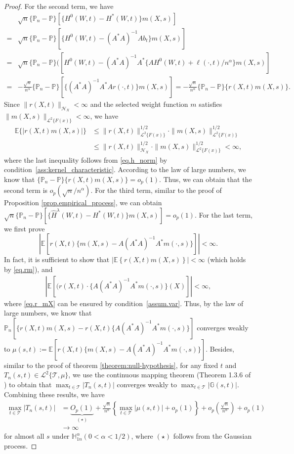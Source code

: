\documentclass[
  12pt]{article}
\def\to{\rightarrow}
\def\mE{\mathbb{E}}
\def\mG{\mathbb{G}}
\def\mH{\mathbb{H}}
\def\mP{\mathbb{P}}
\def\cH{\mathcal{H}}
\def\cL{\mathcal{L}}
\def\cT{\mathcal{T}}
\def\mE{\mathbb{E}}
\begin{document}
\begin{proof}
For the second term, we have
\begin{align*}
   & \sqrt{n}\{\mathbb{P}_n-\mP\}[\{H^0(W,t)-H^*(W,t)\}m(X,s)]\\
   =&\sqrt{n}\{\mathbb{P}_n-\mP\}[\{H^0(W,t)-(A^*A)^{-1}Ab_t\}m(X,s)]\\
    =&\sqrt{n}\{\mathbb{P}_n-\mP\}([H^0(W,t)-(A^*A)^{-1}A^*\{AH^0(W,t)+\ell(\cdot,t)/n^{\alpha}\}m(X,s)]\\
    =&-\frac{\sqrt{n}}{n^{\alpha}}\{\mathbb{P}_n-\mP\}[\{(A^*A)^{-1}A^*Ar(\cdot,t)\}m(X,s)]=-\frac{\sqrt{n}}{n^{\alpha}}\{\mathbb{P}_n-\mP\}\{r(X,t)m(X,s)\}.
\end{align*}
Since $\|r(X,t)\|_{\cH_X}<
\infty$ and the selected weight function $m$ satisfies $\| m(X,s)\|_{\mathcal{L}^2\{F(x)\}}<\infty$, we have
\begin{align}
\mE\{|r(X,t)m(X,s)|\}&\le \| r(X,t)\|_{\mathcal{L}^2\{F(x)\}}^{1/2}\cdot \| m(X,s)\|_{\mathcal{L}^2\{F(x)\}}^{1/2} \nonumber \\
	&\le \| r(X,t)\|_{\mathcal{H}_X}^{1/2}\cdot \| m(X,s)\|_{\mathcal{L}^2\{F(x)\}}^{1/2}<\infty, \label{eq.rm}
\end{align}
where the last inequality follows from \eqref{eq.h_norm} by condition~\ref{ass:kernel_characteristic}. According to the law of large numbers, we know that $\{\mathbb{P}_n-\mP\}\{r(X,t)m(X,s)\}=o_p(1)$. Thus, we can obtain that the second term is $o_p(\sqrt{n}/n^\alpha)$. For the third term, similar to the proof of Proposition \ref{prop.empirical_process}, we can obtain $\sqrt{n}\{\mathbb{P}_n-\mP\}[\{\widehat{H}^\lambda(W,t)-H^*(W,t)\}m(X,s)]=o_p(1)$. For the last term, we first prove 
$$\left|\mathbb{E}[r(X,t)\{m(X,s)-A(A^*A)^{-1}A^*m(\cdot,s)\}] \right|<\infty.
$$
In fact, it is sufficient to show that $|\mathbb{E} \left\{r(X,t) m(X,s)\right\}|<\infty$ (which holds by \eqref{eq.rm}), and 
\begin{align}
    \left|\mathbb{E} [(r(X,t)\cdot \{A(A^*A)^{-1}A^*m(\cdot,s)\}(X)]\right|<\infty, \label{eq.r_mX}
\end{align}
where \eqref{eq.r_mX} can be ensured by condition~\ref{assum.var}. Thus, by the law of large numbers, we know that $\mP_n[\{r(X,t)m(X,s)-r(X,t)\{A(A^*A)^{-1}A^*m(\cdot,s)\}]$ converges weakly to $\mu(s,t):=\mathbb{E}[r(X,t)\{m(X,s)-A(A^*A)^{-1}A^*m(\cdot,s)\}]$. Besides, similar to the proof of theorem \ref{theorem:null-hypothesis}, for any fixed $t$ and $T_n(s,t)\in \cL^2\{\cT, \mu \}$, we use the continuous mapping theorem (Theorem 1.3.6 of \cite{wellner2013weak}) to obtain that $\max_{t\in \cT} |T_n(s,t)|$ converges weakly to $\max_{t\in \cT} |\mG(s,t)|$. Combining these results, we have
\begin{align*}
     \max_{t\in \cT} |T_n(s,t)|&=\underset{( \star )}{\underbrace{O_p(1)}}+ \frac{\sqrt{n}}{n^{\alpha}}\left\{\max_{t\in \cT} |\mu(s,t)| +o_p(1)\right\} + o_p\left(\frac{\sqrt{n}}{n^\alpha}\right) +o_p(1) \\
    &\to \infty
\end{align*}
for almost all $s$ under $\mH_{1n}^{\alpha} (0<\alpha<1/2)$, where $(\star )$ follows from the Gaussian process.



\end{proof}
\end{document}
